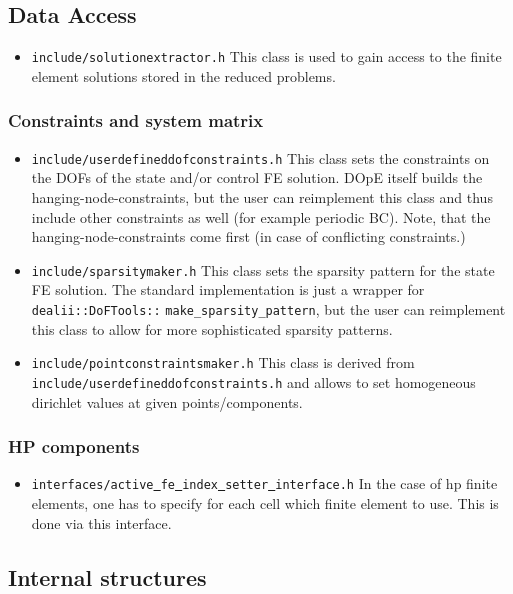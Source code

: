 \subsection{Data Access}
\begin{itemize}
\item \texttt{include/solutionextractor.h} This class is used to gain access to the finite element 
  solutions stored in the reduced problems.
\end{itemize}

\subsubsection{Constraints and system matrix}
\begin{itemize}
\item \texttt{include/userdefineddofconstraints.h} This class sets the constraints on the DOFs of the state and/or control FE solution. DOpE itself builds the hanging-node-constraints, but the user can reimplement this class and thus include other constraints as well (for example periodic BC). Note, that the hanging-node-constraints come first (in case of conflicting constraints.)
\item \texttt{include/sparsitymaker.h} This class sets the sparsity pattern for the state FE solution. The standard implementation is just a wrapper for \texttt{dealii::DoFTools::} \texttt{make\_sparsity\_pattern}, but the user can reimplement this class to allow for more sophisticated sparsity patterns.
\item \texttt{include/pointconstraintsmaker.h} This class is derived from \texttt{include/userdefineddofconstraints.h}
  and allows to set homogeneous dirichlet values at given points/components.
\end{itemize}

\subsubsection{HP components}
\begin{itemize}
\item \texttt{interfaces/active\underline{ }fe\underline{ }index\underline{ }setter\underline{ }interface.h} In the case of hp finite elements, one has to specify for each cell which finite element to use. This is done via this interface.
\end{itemize}

\subsection{Internal structures}
